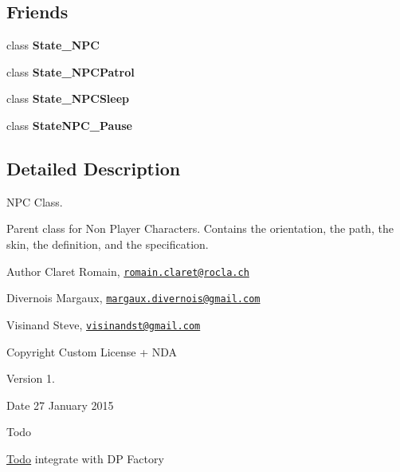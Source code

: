 \subsection*{Friends}
\begin{DoxyCompactItemize}
\item 
\hypertarget{class_g___n_p_c_a8637bfc8defef1ad32422253d010c4ff}{}class {\bfseries State\+\_\+\+N\+P\+C}\label{class_g___n_p_c_a8637bfc8defef1ad32422253d010c4ff}

\item 
\hypertarget{class_g___n_p_c_a4b57e3358a405f4a4d0126d3bf242db3}{}class {\bfseries State\+\_\+\+N\+P\+C\+Patrol}\label{class_g___n_p_c_a4b57e3358a405f4a4d0126d3bf242db3}

\item 
\hypertarget{class_g___n_p_c_a2299bdba08294f25fb55270a08d4247e}{}class {\bfseries State\+\_\+\+N\+P\+C\+Sleep}\label{class_g___n_p_c_a2299bdba08294f25fb55270a08d4247e}

\item 
\hypertarget{class_g___n_p_c_a8be5e49557ce01ea384abcd02bc436da}{}class {\bfseries State\+N\+P\+C\+\_\+\+Pause}\label{class_g___n_p_c_a8be5e49557ce01ea384abcd02bc436da}

\end{DoxyCompactItemize}


\subsection{Detailed Description}
N\+P\+C Class. 

Parent class for Non Player Characters. Contains the orientation, the path, the skin, the definition, and the specification. \begin{DoxyAuthor}{Author}
Claret Romain, \href{mailto:romain.claret@rocla.ch}{\tt romain.\+claret@rocla.\+ch} 

Divernois Margaux, \href{mailto:margaux.divernois@gmail.com}{\tt margaux.\+divernois@gmail.\+com} 

Visinand Steve, \href{mailto:visinandst@gmail.com}{\tt visinandst@gmail.\+com} 
\end{DoxyAuthor}
\begin{DoxyCopyright}{Copyright}
Custom License + N\+D\+A 
\end{DoxyCopyright}
\begin{DoxyVersion}{Version}
1. 
\end{DoxyVersion}
\begin{DoxyDate}{Date}
27 January 2015 
\end{DoxyDate}
\begin{DoxyRefDesc}{Todo}
\item[\hyperlink{todo__todo000008}{Todo}]integrate with D\+P Factory \end{DoxyRefDesc}



